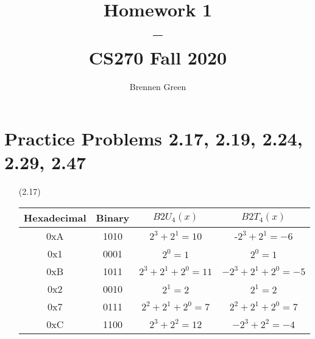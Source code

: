\documentclass[11pt]{article}
\begin{document}
\title{Homework 1\\--\\\large CS270 Fall 2020}
\date{}
\author{Brennen Green}
\maketitle

\section{Practice Problems 2.17, 2.19, 2.24, 2.29, 2.47}
    \begin{enumerate}
        \item[(2.17)]
            \begin{tabular}{||c | c | c | c||} 
            \hline
            Hexadecimal & Binary & $B2U_4(x)$ & $B2T_4(x)$ \\ [0.5ex] 
            \hline\hline
            0xA & 1010 & $2^3 + 2^1 = 10$ & -$2^3 + 2^1 = -6$ \\ 
            \hline
            0x1 & 0001 & $2^0 = 1$ & $ 2^0 = 1 $ \\
            \hline
            0xB & 1011 & $2^3 + 2^1 + 2^0 = 11 $ & $-2^3 + 2^1 + 2^0 = -5$ \\
            \hline
            0x2 & 0010 & $ 2^1 = 2 $ & $ 2^1 = 2 $ \\
            \hline
            0x7 & 0111 & $ 2^2 + 2^1 + 2^0 = 7 $ & $ 2^2 + 2^1 + 2^0 = 7 $ \\
            \hline
            0xC & 1100 & $ 2^3 + 2^2 = 12 $ & $ -2^3 + 2^2 = -4 $ \\ 
            \hline
            \end{tabular}
           

\end{enumerate}
\end{document}
